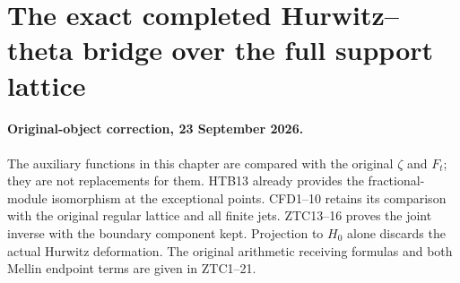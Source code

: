 \section{The exact completed Hurwitz--theta bridge over the full support lattice}
\label{sec:completed-hurwitz-theta-bridge}

\paragraph{Original-object correction, 23 September 2026.}
The auxiliary functions in this chapter are compared with the original
$\zeta$ and $F_t$; they are not replacements for them. HTB13 already
provides the fractional-module isomorphism at the exceptional points.
CFD1--10 retains its comparison with the original regular lattice and
all finite jets. ZTC13--16 proves the joint inverse with the boundary
component kept. Projection to $H_0$ alone discards the actual Hurwitz
deformation. The original arithmetic receiving formulas and both
Mellin endpoint terms are given in ZTC1--21.

